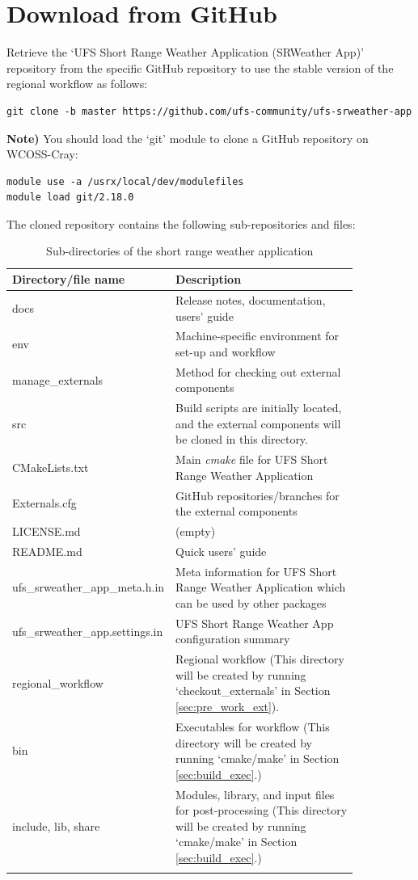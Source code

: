 \documentclass[11pt,fleqn]{report}              %
\begin{document}
\section{Download from GitHub}
\label{sec:pre_work_git}

Retrieve the `UFS Short Range Weather Application (SRWeather App)' repository from the specific GitHub repository to use the stable version of the regional workflow as follows:

\lstset{language=bash}   
\begin{lstlisting}[frame=trBL]
git clone -b master https://github.com/ufs-community/ufs-srweather-app
\end{lstlisting}

{\bf Note)} You should load the `git' module to clone a GitHub repository on WCOSS-Cray:
\lstset{language=bash}   
\begin{lstlisting}[frame=trBL]
module use -a /usrx/local/dev/modulefiles
module load git/2.18.0
\end{lstlisting}


The cloned repository contains the following sub-repositories and files:
{
\fontsize{10}{12}\selectfont
\begin{longtable}{ p{0.28\linewidth} | p{0.57\linewidth} }
\hline
\hline
 Directory/file name & Description \\
\hline
 docs & Release notes, documentation, users' guide  \\
 env & Machine-specific environment for set-up and workflow \\
 manage\_externals & Method for checking out external components\\
 src & Build scripts are initially located, and the external components will be cloned in this directory.  \\
\hdashline
 CMakeLists.txt & Main {\it cmake} file for UFS Short Range Weather Application \\
 Externals.cfg & GitHub repositories/branches for the external components \\
 LICENSE.md & (empty) \\
 README.md & Quick users' guide \\
 ufs\_srweather\_app\_meta.h.in & Meta information for UFS Short Range Weather Application which can be used by other packages  \\
 ufs\_srweather\_app.settings.in & UFS Short Range Weather App configuration summary \\
\hdashline
 regional\_workflow & Regional workflow (This directory will be created by running `checkout\_externals' in Section \ref{sec:pre_work_ext}). \\
 bin & Executables for workflow (This directory will be created by running `cmake/make' in Section \ref{sec:build_exec}.) \\
 include, lib, share & Modules, library, and input files for post-processing (This directory will be created by running `cmake/make' in Section \ref{sec:build_exec}.) \\
\hline
\caption{Sub-directories of the short range weather application}
\label{table:srwapp_dir}
\end{longtable}
}
\end{document}
